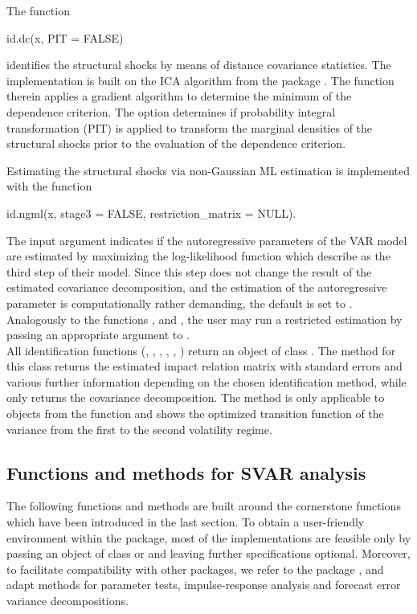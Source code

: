 \documentclass[nojss]{jss}\usepackage[]{graphicx}\usepackage[]{color}
\begin{document}
The function
\begin{CodeChunk}
\begin{CodeInput}
id.dc(x, PIT = FALSE)
\end{CodeInput}
\end{CodeChunk}
identifies the structural shocks by means of distance covariance statistics. The implementation is built on the ICA algorithm from the package  \citep{steadyICA}. The function  therein applies a gradient algorithm to determine the minimum of the dependence criterion. The option  determines if probability integral transformation (PIT) is applied to transform the marginal densities of the structural shocks prior to the evaluation of the dependence criterion.

Estimating the structural shocks via non-Gaussian ML estimation is implemented with the function
\begin{CodeChunk}
\begin{CodeInput}
id.ngml(x, stage3 = FALSE, restriction_matrix = NULL).
\end{CodeInput}
\end{CodeChunk}
The input argument  indicates if the autoregressive parameters of the VAR model are estimated by maximizing the log-likelihood function which \cite{LMS2017} describe as the third step of their model. Since this step does not change the result of the estimated covariance decomposition, and the estimation of the autoregressive parameter is computationally rather demanding, the default is set to . Analogously to the functions ,  and , the user may run a restricted estimation by passing an appropriate  argument to .  \\
All identification functions (, , , , , ) return an object of class . The  method for this class returns the estimated impact relation matrix with standard errors and various further information depending on the chosen identification method, while  only returns the covariance decomposition. The  method is only applicable to objects from the function  and shows the optimized transition function of the variance from the first to the second volatility regime.

\subsection{Functions and methods for SVAR analysis}
The following functions and methods are built around the cornerstone functions which have been introduced in the last section. To obtain a user-friendly environment within the  package, most of the implementations are feasible only by passing an object of class  or  and leaving further specifications optional. Moreover, to facilitate compatibility with other  packages, we refer to the  package \citep{pfaff2008}, and adapt methods for parameter tests, impulse-response analysis and forecast error variance decompositions.
\end{document}
